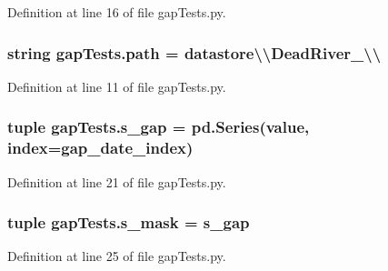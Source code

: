 Definition at line 16 of file gap\+Tests.\+py.

\hypertarget{namespacegap_tests_a3f57b56fc8e69d0dcd827c75f6743077}{}
\subsubsection[{path}]{\setlength{\rightskip}{0pt plus 5cm}string gap\+Tests.\+path = \textquotesingle{}datastore\textbackslash{}\textbackslash{}\+Dead\+River\+\_\textbackslash{}\textbackslash{}\textquotesingle{}}\label{namespacegap_tests_a3f57b56fc8e69d0dcd827c75f6743077}


Definition at line 11 of file gap\+Tests.\+py.

\hypertarget{namespacegap_tests_a350ecaddda824acaaadc5c9162516906}{}
\subsubsection[{s\+\_\+gap}]{\setlength{\rightskip}{0pt plus 5cm}tuple gap\+Tests.\+s\+\_\+gap = pd.\+Series(value, index={\bf gap\+\_\+date\+\_\+index})}\label{namespacegap_tests_a350ecaddda824acaaadc5c9162516906}


Definition at line 21 of file gap\+Tests.\+py.

\hypertarget{namespacegap_tests_ab33889c225b00a0897051f8b89d74acd}{}
\subsubsection[{s\+\_\+mask}]{\setlength{\rightskip}{0pt plus 5cm}tuple gap\+Tests.\+s\+\_\+mask = {\bf s\+\_\+gap}}\label{namespacegap_tests_ab33889c225b00a0897051f8b89d74acd}


Definition at line 25 of file gap\+Tests.\+py.

